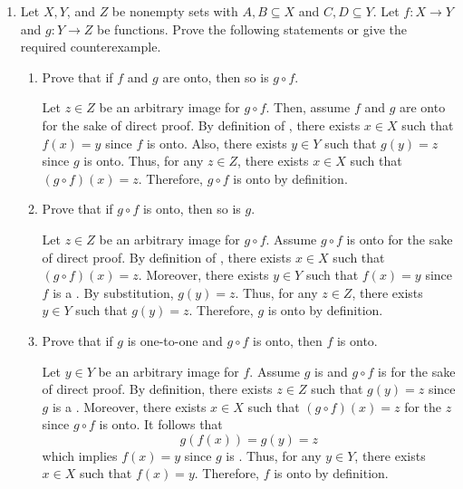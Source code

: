 \begin{enumerate}
  \newpage
  \item Let $X, Y$, and $Z$ be nonempty sets with $A, B \subseteq X$ and $C, D \subseteq Y$. 
  Let $f: X \rightarrow Y$ and $g: Y \rightarrow Z$ be functions. 
  Prove the following statements or give the required counterexample.
  \begin{enumerate}
    \item Prove that if $f$ and $g$ are onto, then so is $g \circ f$.
    \begin{subprove}
      Let $z \in Z$ be an arbitrary image for $g \circ f$. 
      Then, assume $f$ and $g$ are onto for the sake of direct proof.
      By definition of , 
      there exists $x \in X$ such that $f(x) = y$ since $f$ is onto.
      Also, there exists $y \in Y$ such that $g(y) = z$ since $g$ is onto.\proofstep
      Thus, for any $z \in Z$, there exists $x \in X$ such that $(g \circ f)(x) = z$.
      Therefore, $g \circ f$ is onto by definition.
    \end{subprove}
    \item Prove that if $g \circ f$ is onto, then so is $g$.
    \begin{subprove}
      Let $z \in Z$ be an arbitrary image for $g \circ f$. 
      Assume $g \circ f$ is onto for the sake of direct proof.
      By definition of , 
      there exists $x \in X$ such that $(g \circ f)(x) = z$.
      Moreover, there exists $y \in Y$ such that $f(x) = y$ since $f$ is a .
      By substitution, $g(y) = z$.\proofstep
      Thus, for any $z \in Z$, there exists $y \in Y$ such that $g(y) = z$.
      Therefore, $g$ is onto by definition.
    \end{subprove}
    \item Prove that if $g$ is one-to-one and $g \circ f$ is onto, then $f$ is onto.
    \begin{subprove}
      Let $y \in Y$ be an arbitrary image for $f$. 
      Assume $g$ is  and $g \circ f$ is  for the sake of direct proof.
      By definition, there exists $z \in Z$ such that $g(y) = z$ since $g$ is a .
      Moreover, there exists $x \in X$ such that $(g \circ f)(x) = z$ for the $z$ since $g \circ f$ is onto.
      It follows that 
      $$g(f(x)) = g(y) = z$$
      which implies $f(x) = y$ since $g$ is .\proofstep
      Thus, for any $y \in Y$, there exists $x \in X$ such that $f(x) = y$.
      Therefore, $f$ is onto by definition.
    \end{subprove}

\end{enumerate}
\end{enumerate}

